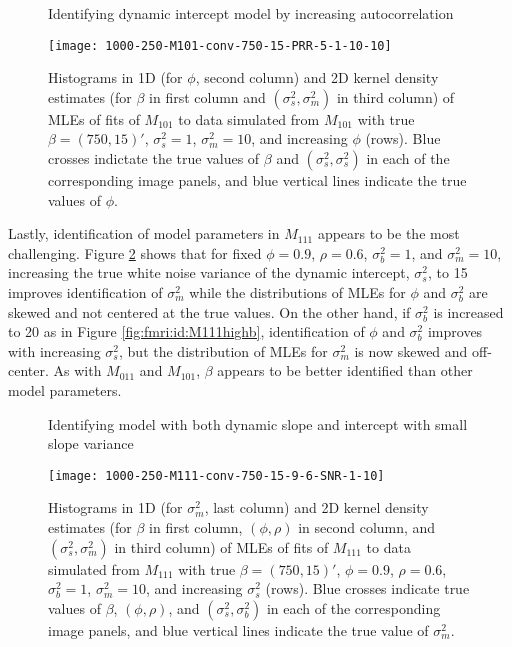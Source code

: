 \begin{figure}
\ssp
\centering
\caption{Identifying dynamic intercept model by increasing autocorrelation} \label{fig:fmri:id:M101PRR}
\texttt{[image: 1000-250-M101-conv-750-15-PRR-5-1-10-10]}
\caption*{Histograms in 1D (for $\phi$, second column) and 2D kernel density estimates (for $\beta$ in first column and $(\sigma^2_s,\sigma^2_m)$ in third column) of MLEs of fits of $M_{101}$ to data simulated from $M_{101}$ with true $\beta = (750,15)'$, $\sigma^2_s = 1$, $\sigma^2_m = 10$, and increasing $\phi$ (rows). Blue crosses indictate the true values of $\beta$ and $(\sigma^2_s,\sigma^2_s)$ in each of the corresponding image panels, and blue vertical lines indicate the true values of $\phi$.}
\end{figure}

Lastly, identification of model parameters in $M_{111}$ appears to be the most challenging. Figure \ref{fig:fmri:id:M111lowb} shows that for fixed $\phi = 0.9$, $\rho = 0.6$, $\sigma^2_b = 1$, and $\sigma^2_m = 10$, increasing the true white noise variance of the dynamic intercept, $\sigma^2_s$, to 15 improves identification of $\sigma^2_m$ while the distributions of MLEs for $\phi$ and $\sigma^2_b$ are skewed and not centered at the true values. On the other hand, if $\sigma^2_b$ is increased to 20 as in Figure \ref{fig:fmri:id:M111highb}, identification of $\phi$ and $\sigma^2_b$ improves with increasing $\sigma^2_s$, but the distribution of MLEs for $\sigma^2_m$ is now skewed and off-center. As with $M_{011}$ and $M_{101}$, $\beta$ appears to be better identified than other model parameters.

\begin{figure}
\ssp
\centering
\caption{Identifying model with both dynamic slope and intercept with small slope variance} \label{fig:fmri:id:M111lowb}
\texttt{[image: 1000-250-M111-conv-750-15-9-6-SNR-1-10]}
\caption*{Histograms in 1D (for $\sigma^2_m$, last column) and 2D kernel density estimates (for $\beta$ in first column, $(\phi,\rho)$ in second column, and $(\sigma^2_s,\sigma^2_m)$ in third column) of MLEs of fits of $M_{111}$ to data simulated from $M_{111}$ with true $\beta = (750,15)'$, $\phi = 0.9$, $\rho = 0.6$, $\sigma^2_b = 1$, $\sigma^2_m = 10$, and increasing $\sigma^2_s$ (rows). Blue crosses indicate true values of $\beta$, $(\phi,\rho)$, and $(\sigma^2_s,\sigma^2_b)$ in each of the corresponding image panels, and blue vertical lines indicate the true value of $\sigma^2_m$.}
\end{figure}

